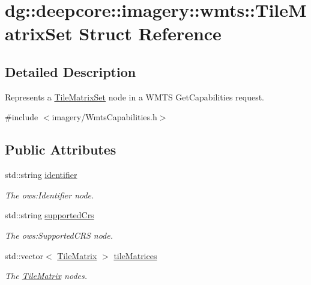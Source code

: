 \hypertarget{structdg_1_1deepcore_1_1imagery_1_1wmts_1_1_tile_matrix_set}{}\section{dg\+:\+:deepcore\+:\+:imagery\+:\+:wmts\+:\+:Tile\+Matrix\+Set Struct Reference}
\label{structdg_1_1deepcore_1_1imagery_1_1wmts_1_1_tile_matrix_set}


\subsection{Detailed Description}
Represents a \hyperlink{structdg_1_1deepcore_1_1imagery_1_1wmts_1_1_tile_matrix_set}{Tile\+Matrix\+Set} node in a W\+M\+TS Get\+Capabilities request. 

{\ttfamily \#include $<$imagery/\+Wmts\+Capabilities.\+h$>$}

\subsection*{Public Attributes}
\begin{DoxyCompactItemize}
\item 
std\+::string \hyperlink{structdg_1_1deepcore_1_1imagery_1_1wmts_1_1_tile_matrix_set_a2b6b1065b7596abbadab0ae4889c3e5c}{identifier}
\begin{DoxyCompactList}\small\item\em The ows\+:Identifier node. \end{DoxyCompactList}\item 
std\+::string \hyperlink{structdg_1_1deepcore_1_1imagery_1_1wmts_1_1_tile_matrix_set_a1105d518a115fa42e1bf1d9e1eaf41f0}{supported\+Crs}
\begin{DoxyCompactList}\small\item\em The ows\+:Supported\+C\+RS node. \end{DoxyCompactList}\item 
std\+::vector$<$ \hyperlink{structdg_1_1deepcore_1_1imagery_1_1wmts_1_1_tile_matrix}{Tile\+Matrix} $>$ \hyperlink{structdg_1_1deepcore_1_1imagery_1_1wmts_1_1_tile_matrix_set_a7359847b6ccb8bb86a41640e43e15876}{tile\+Matrices}
\begin{DoxyCompactList}\small\item\em The \hyperlink{structdg_1_1deepcore_1_1imagery_1_1wmts_1_1_tile_matrix}{Tile\+Matrix} nodes. \end{DoxyCompactList}\end{DoxyCompactItemize}


